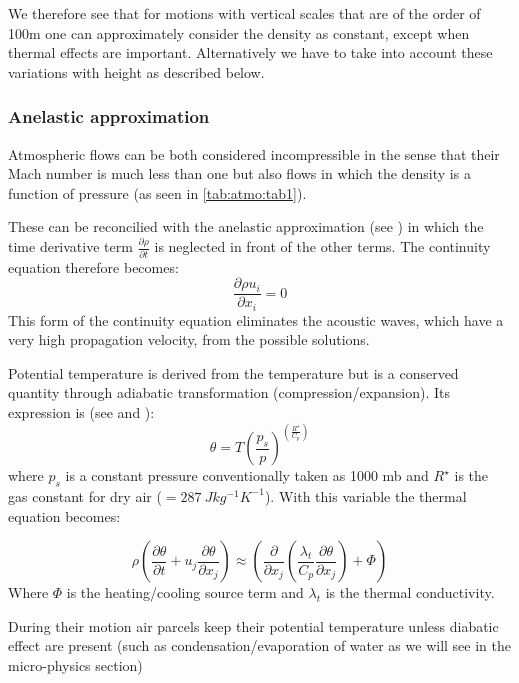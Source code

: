 We therefore see that for motions with vertical scales that are of the order
of 100m one can approximately consider the density as constant, except when
thermal effects are important. Alternatively we have to take into account
these variations with height as described below.

\subsubsection{Anelastic approximation}
Atmospheric flows can be both considered incompressible in the sense that
their Mach number is much less than one but also flows in which the density
is a function of pressure (as seen in \tablename{} \ref{tab:atmo:tab1}).

These can be reconcilied with the anelastic approximation (see \cite{Pielke:1984})
 in which the time derivative term $\frac{\partial \rho }{\partial
t}$ is neglected in front of the other terms. The continuity equation
therefore becomes:
\begin{equation}
\frac{\partial \rho u_{i} }{\partial x_{i} }=0
\end{equation}
This form of the continuity equation eliminates the acoustic waves, which
have a very high propagation velocity, from the possible solutions.

Potential temperature is derived from the temperature but is a conserved
quantity through adiabatic transformation (compression/expansion). Its
expression is (see \cite{Holton:1979} and \cite{Stull:1988}):
\begin{equation}
\label{eq1}
\theta =T\left( {\frac{p_{s}}{p}} \right)^{\left( {\frac{R^{\star }}{C_{p}}} \right)}
\end{equation}
where $p_{s}$ is a constant pressure conventionally taken as 1000 mb
and $R^{\star}$ is the gas constant for dry air ($=\SI{287}{Jkg^{-1}K^{-1}}$).
With this variable the thermal equation becomes:

\begin{equation}
\rho \left( {\frac{\partial \theta }{\partial t}+u_{j} \frac{\partial \theta
}{\partial x_{j} }} \right)\approx\left( {\frac{\partial }{\partial x_{j}
}\left( {\frac{\lambda_{t} }{C_{p} }\frac{\partial \theta}{\partial x_{j} }}
\right)+\Phi } \right)
\end{equation}
Where $\Phi $ is the heating/cooling source term and $\lambda_{t}$ is the thermal conductivity.

During their motion air parcels keep their potential temperature unless
diabatic effect are present (such as condensation/evaporation of water as we
will see in the micro-physics section)

